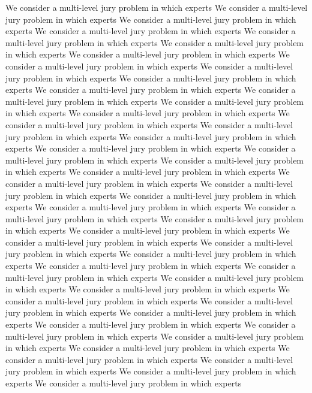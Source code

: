 \documentclass[letterpaper]{article} %
\begin{document}
We consider a multi-level jury problem in which experts
We consider a multi-level jury problem in which experts
We consider a multi-level jury problem in which experts
We consider a multi-level jury problem in which experts
We consider a multi-level jury problem in which experts
We consider a multi-level jury problem in which experts
We consider a multi-level jury problem in which experts
We consider a multi-level jury problem in which experts
We consider a multi-level jury problem in which experts
We consider a multi-level jury problem in which experts
We consider a multi-level jury problem in which experts
We consider a multi-level jury problem in which experts
We consider a multi-level jury problem in which experts
We consider a multi-level jury problem in which experts
We consider a multi-level jury problem in which experts
We consider a multi-level jury problem in which experts
We consider a multi-level jury problem in which experts
We consider a multi-level jury problem in which experts
We consider a multi-level jury problem in which experts
We consider a multi-level jury problem in which experts
We consider a multi-level jury problem in which experts
We consider a multi-level jury problem in which experts
We consider a multi-level jury problem in which experts
We consider a multi-level jury problem in which experts
We consider a multi-level jury problem in which experts
We consider a multi-level jury problem in which experts
We consider a multi-level jury problem in which experts
We consider a multi-level jury problem in which experts
We consider a multi-level jury problem in which experts
We consider a multi-level jury problem in which experts
We consider a multi-level jury problem in which experts
We consider a multi-level jury problem in which experts
We consider a multi-level jury problem in which experts
We consider a multi-level jury problem in which experts
We consider a multi-level jury problem in which experts
We consider a multi-level jury problem in which experts
We consider a multi-level jury problem in which experts
We consider a multi-level jury problem in which experts
We consider a multi-level jury problem in which experts
We consider a multi-level jury problem in which experts
We consider a multi-level jury problem in which experts
We consider a multi-level jury problem in which experts
We consider a multi-level jury problem in which experts
We consider a multi-level jury problem in which experts
We consider a multi-level jury problem in which experts
We consider a multi-level jury problem in which experts
\clearpage

\end{document}
